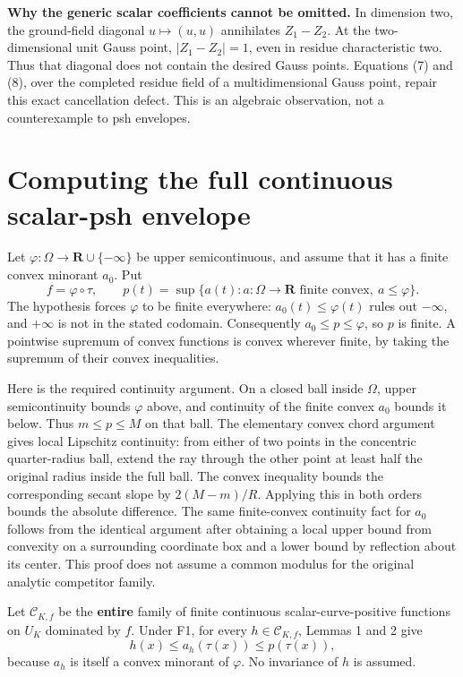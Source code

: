 \documentclass[11pt]{article}
\begin{document}
\textbf{Why the generic scalar coefficients cannot be omitted.} In dimension two, the ground-field diagonal \(u\mapsto(u,u)\) annihilates \(Z_1-Z_2\). At the two-dimensional unit Gauss point, \(|Z_1-Z_2|=1\), even in residue characteristic two. Thus that diagonal does not contain the desired Gauss points. Equations (7) and (8), over the completed residue field of a multidimensional Gauss point, repair this exact cancellation defect. This is an algebraic observation, not a counterexample to psh envelopes.

\section{Computing the full continuous scalar-psh envelope}

Let \(\varphi:\Omega\to\mathbf R\cup\{-\infty\}\) be upper semicontinuous, and assume that it has a finite convex minorant \(a_0\). Put
\[
f=\varphi\circ\tau,\qquad
p(t)=\sup\{a(t):a:\Omega\to\mathbf R\text{ finite convex},\ a\leq\varphi\}.
\tag{10}
\]
The hypothesis forces \(\varphi\) to be finite everywhere: \(a_0(t)\leq\varphi(t)\) rules out \(-\infty\), and \(+\infty\) is not in the stated codomain. Consequently \(a_0\leq p\leq\varphi\), so \(p\) is finite. A pointwise supremum of convex functions is convex wherever finite, by taking the supremum of their convex inequalities.

Here is the required continuity argument. On a closed ball inside \(\Omega\), upper semicontinuity bounds \(\varphi\) above, and continuity of the finite convex \(a_0\) bounds it below. Thus \(m\leq p\leq M\) on that ball. The elementary convex chord argument gives local Lipschitz continuity: from either of two points in the concentric quarter-radius ball, extend the ray through the other point at least half the original radius inside the full ball. The convex inequality bounds the corresponding secant slope by \(2(M-m)/R\). Applying this in both orders bounds the absolute difference. The same finite-convex continuity fact for \(a_0\) follows from the identical argument after obtaining a local upper bound from convexity on a surrounding coordinate box and a lower bound by reflection about its center. This proof does not assume a common modulus for the original analytic competitor family.

Let \(\mathcal C_{K,f}\) be the \textbf{entire} family of finite continuous scalar-curve-positive functions on \(U_K\) dominated by \(f\). Under F1, for every \(h\in\mathcal C_{K,f}\), Lemmas 1 and 2 give
\[
h(x)\leq a_h(\tau(x))\leq p(\tau(x)),
\tag{11}
\]
because \(a_h\) is itself a convex minorant of \(\varphi\). No invariance of \(h\) is assumed.
\end{document}
